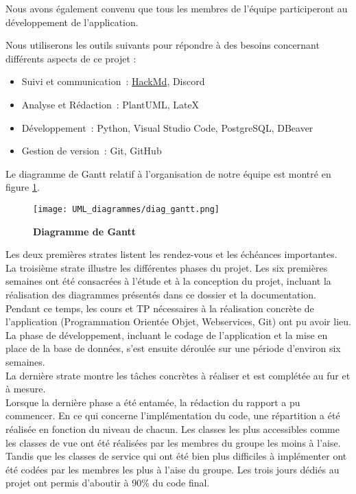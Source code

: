 \documentclass[11pt]{article}
\begin{document}
Nous avons également convenu que tous les membres de l'équipe participeront au développement de l'application.

\bigbreak

Nous utiliserons les outils suivants pour répondre à des besoins concernant différents aspects de ce projet :
\begin{itemize}
    \item{Suivi et communication~: \href{https://hackmd.io/CMTCDVW6Spe2PHXOhdKTRQ}{HackMd}, Discord}
    \item{Analyse et Rédaction~: PlantUML, LateX}
    \item{Développement~: Python, Visual Studio Code, PostgreSQL, DBeaver}
    \item{Gestion de version~: Git, GitHub}
\end{itemize}


\bigbreak

Le diagramme de Gantt relatif à l'organisation de notre équipe est montré en figure \ref{UML_gantt}.\\


\begin{figure}[H]
    \caption{\textbf{Diagramme de Gantt}}
    \label{UML_gantt}
    \centering
    \texttt{[image: UML\_diagrammes/diag\_gantt.png]}
\end{figure}

Les deux premières strates listent les rendez-vous et les échéances importantes. \\

La troisième strate illustre les différentes phases du projet. Les six premières semaines ont été consacrées à l'étude et à la conception du projet, incluant la réalisation des diagrammes présentés dans ce dossier et la documentation. Pendant ce temps, les cours et TP nécessaires à la réalisation concrète de l'application (Programmation Orientée Objet, Webservices, Git) ont pu avoir lieu. La phase de développement, incluant le codage de l'application et la mise en place de la base de données, s'est ensuite déroulée sur une période d'environ six semaines. \\

La dernière strate montre les tâches concrètes à réaliser et est complétée au fur et à mesure.\\

Lorsque la dernière phase a été entamée, la rédaction du rapport a pu commencer. 
En ce qui concerne l’implémentation du code, une répartition a été réalisée en fonction du niveau de chacun. Les classes les plus accessibles comme les classes de vue ont été réalisées par les membres du groupe les moins à l’aise. Tandis que les classes de service qui ont été bien plus difficiles à implémenter ont été codées par les membres les plus à l’aise du groupe. Les trois jours dédiés au projet ont permis d’aboutir à 90\% du code final. \\
\end{document}
